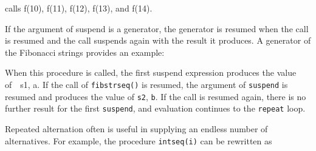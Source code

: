 \noindent
calls f(10), f(11), f(12), f(13), and f(14).

If the argument of suspend is a generator, the generator is resumed
when the call is resumed and the call suspends again with the result
it produces. A generator of the Fibonacci strings provides an example:


When this procedure is called, the first suspend expression produces
the value of\ \ s1, {\textquotedbl}a{\textquotedbl}. If the call of
\texttt{fibstrseq()} is resumed, the argument of \texttt{suspend} is
resumed and produces the value of \texttt{s2},
\texttt{{\textquotedbl}b{\textquotedbl}}. If the call is resumed
again, there is no further result for the first \texttt{suspend}, and
evaluation continues to the \texttt{repeat} loop.

Repeated alternation often is useful in supplying an endless number of
alternatives. For example, the procedure \texttt{intseq(i)} can be
rewritten as

